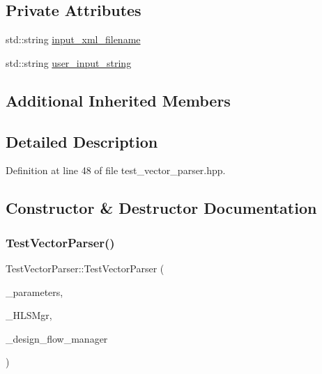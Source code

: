 \subsection*{Private Attributes}
\begin{DoxyCompactItemize}
\item 
std\+::string \hyperlink{classTestVectorParser_a8bf0baf83cbbb5e93694f1cb89059fbd}{input\+\_\+xml\+\_\+filename}
\item 
std\+::string \hyperlink{classTestVectorParser_a2c13d1f9b525391d16b4171a38857eca}{user\+\_\+input\+\_\+string}
\end{DoxyCompactItemize}
\subsection*{Additional Inherited Members}


\subsection{Detailed Description}


Definition at line 48 of file test\+\_\+vector\+\_\+parser.\+hpp.



\subsection{Constructor \& Destructor Documentation}
\mbox{\label{classTestVectorParser_a9a879310446467aa26d063b61ead983e}} 
\subsubsection{\texorpdfstring{Test\+Vector\+Parser()}{TestVectorParser()}}
{\footnotesize\ttfamily Test\+Vector\+Parser\+::\+Test\+Vector\+Parser (\begin{DoxyParamCaption}\item[{const \hyperlink{Parameter_8hpp_a37841774a6fcb479b597fdf8955eb4ea}{Parameter\+Const\+Ref}}]{\+\_\+parameters,  }\item[{const \hyperlink{hls__manager_8hpp_acd3842b8589fe52c08fc0b2fcc813bfe}{H\+L\+S\+\_\+manager\+Ref}}]{\+\_\+\+H\+L\+S\+Mgr,  }\item[{const Design\+Flow\+Manager\+Const\+Ref}]{\+\_\+design\+\_\+flow\+\_\+manager }\end{DoxyParamCaption})}



